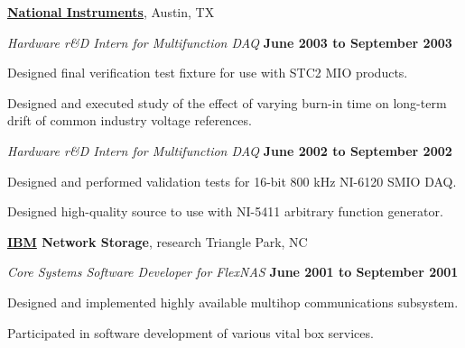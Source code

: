\documentclass{article}
\newcommand{\halfblankline}{\quad\vspace{-0.5\baselineskip}\pagebreak[3]}
\begin{document}
\href{http://www.ni.com/}{\textbf{National Instruments}},
Austin, TX
\begin{outerlist}

\item[] \textit{Hardware r\&D Intern for Multifunction DAQ}%
        \hfill \textbf{June 2003 to September 2003}
\begin{innerlist}
\item Designed final verification test fixture for use with STC2 MIO
        products.
\item Designed and executed study of the effect of varying burn-in time
        on long-term drift of common industry voltage references.
\end{innerlist}

\item[] \textit{Hardware r\&D Intern for Multifunction DAQ}%
        \hfill \textbf{June 2002 to September 2002}
\begin{innerlist}
\item Designed and performed validation tests for 16-bit 800 kHz
        NI-6120 SMIO DAQ.

\item Designed high-quality source to use with NI-5411 arbitrary
        function generator.
\end{innerlist}

\end{outerlist}

\halfblankline

\textbf{\href{http://www.ibm.com/}{IBM} Network Storage},
research Triangle Park, NC
\begin{outerlist}

\item[] \textit{Core Systems Software Developer for FlexNAS}%
        \hfill \textbf{June 2001 to September 2001}
\begin{innerlist}
\item Designed and implemented highly available multihop communications
        subsystem.
\item Participated in software development of various vital box
        services.
\end{innerlist}

\end{outerlist}

\halfblankline
\end{document}
